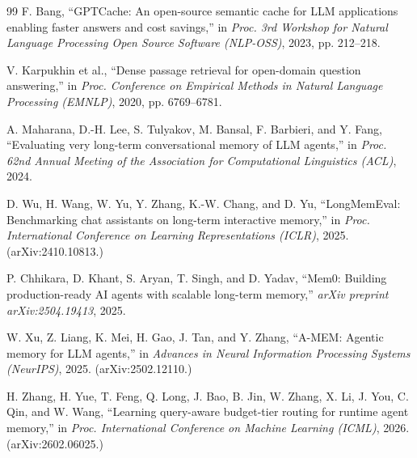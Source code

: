 \documentclass[conference]{IEEEtran}
\begin{document}
\begin{thebibliography}{99}
F. Bang, ``GPTCache: An open-source semantic cache for LLM applications enabling faster answers and cost savings,'' in \textit{Proc. 3rd Workshop for Natural Language Processing Open Source Software (NLP-OSS)}, 2023, pp. 212--218.

V. Karpukhin et al., ``Dense passage retrieval for open-domain question answering,'' in \textit{Proc. Conference on Empirical Methods in Natural Language Processing (EMNLP)}, 2020, pp. 6769--6781.

A. Maharana, D.-H. Lee, S. Tulyakov, M. Bansal, F. Barbieri, and Y. Fang, ``Evaluating very long-term conversational memory of LLM agents,'' in \textit{Proc. 62nd Annual Meeting of the Association for Computational Linguistics (ACL)}, 2024.

D. Wu, H. Wang, W. Yu, Y. Zhang, K.-W. Chang, and D. Yu, ``LongMemEval: Benchmarking chat assistants on long-term interactive memory,'' in \textit{Proc. International Conference on Learning Representations (ICLR)}, 2025. (arXiv:2410.10813.)

P. Chhikara, D. Khant, S. Aryan, T. Singh, and D. Yadav, ``Mem0: Building production-ready AI agents with scalable long-term memory,'' \textit{arXiv preprint arXiv:2504.19413}, 2025.

W. Xu, Z. Liang, K. Mei, H. Gao, J. Tan, and Y. Zhang, ``A-MEM: Agentic memory for LLM agents,'' in \textit{Advances in Neural Information Processing Systems (NeurIPS)}, 2025. (arXiv:2502.12110.)

H. Zhang, H. Yue, T. Feng, Q. Long, J. Bao, B. Jin, W. Zhang, X. Li, J. You, C. Qin, and W. Wang, ``Learning query-aware budget-tier routing for runtime agent memory,'' in \textit{Proc. International Conference on Machine Learning (ICML)}, 2026. (arXiv:2602.06025.)

\end{thebibliography}
\end{document}
